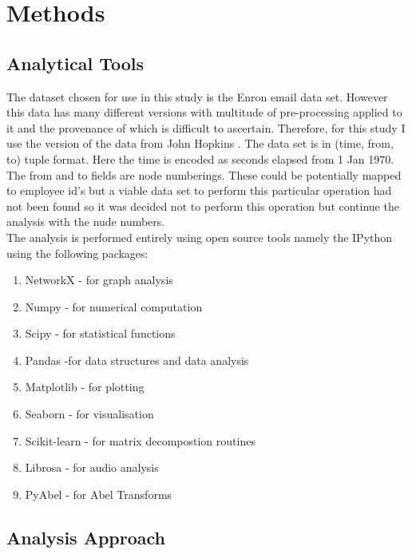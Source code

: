 \chapter{Methods}

\section{Analytical Tools}

The dataset chosen for use in this study is the Enron email data set. However this data has many different versions with multitude of pre-processing applied to it and the provenance of which is difficult to ascertain. Therefore, for this study I use the version of the data from John Hopkins \cite{Park2008}. The data set is in (time, from, to) tuple format. Here the time is encoded as seconds elapsed from 1 Jan 1970. The from and to fields are node numberings. These could be potentially mapped to employee id's but a viable data set to perform this particular operation had not been found so it was decided not to perform this operation but continue the analysis with the nude numbers. \\

The analysis is performed entirely using open source tools namely the IPython using the following packages:

\begin{enumerate}
    \item NetworkX - for graph analysis\cite{hagberg-2008-exploring}
    \item Numpy - for numerical computation \cite{numpy:/content/aip/journal/cise/13/2/10.1109/MCSE.2011.37}
    \item Scipy - for statistical functions\cite{scipy}
    \item Pandas -for data structures and data analysis \cite{mckinney-proc-scipy-2010}
    \item Matplotlib - for plotting \cite{Hunter:2007}
    \item Seaborn - for visualisation\cite{Waskom2012}
    \item Scikit-learn - for matrix decompostion routines\cite{Pedregosa2011d}
    \item Librosa - for audio analysis\cite{brian_mcfee_2015_32193}
    \item PyAbel - for Abel Transforms \cite{daniel_d_hickstein_2016_47423}
\end{enumerate}


\section{Analysis Approach}


